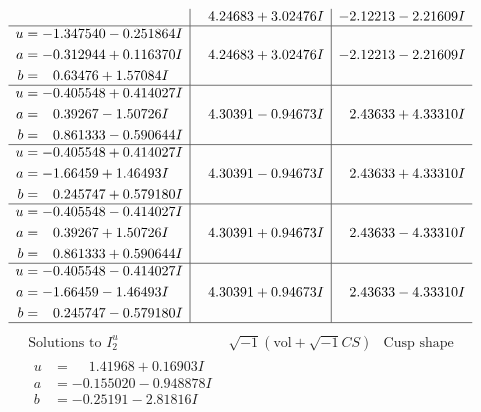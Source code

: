 \documentclass[1p]{elsarticle_modified}
\theoremstyle{definition}
\newcommand{\I}{\sqrt{-1}}
\begin{document}
$$\begin{array}{c|c|c}
 & \phantom{-}4.24683 + 3.02476 I & -2.12213 - 2.21609 I \\ \hline\begin{aligned}
u &= -1.347540 - 0.251864 I \\
a &= -0.312944 + 0.116370 I \\
b &= \phantom{-}0.63476 + 1.57084 I\end{aligned}
 & \phantom{-}4.24683 + 3.02476 I & -2.12213 - 2.21609 I \\ \hline\begin{aligned}
u &= -0.405548 + 0.414027 I \\
a &= \phantom{-}0.39267 - 1.50726 I \\
b &= \phantom{-}0.861333 - 0.590644 I\end{aligned}
 & \phantom{-}4.30391 - 0.94673 I & \phantom{-}2.43633 + 4.33310 I \\ \hline\begin{aligned}
u &= -0.405548 + 0.414027 I \\
a &= -1.66459 + 1.46493 I \\
b &= \phantom{-}0.245747 + 0.579180 I\end{aligned}
 & \phantom{-}4.30391 - 0.94673 I & \phantom{-}2.43633 + 4.33310 I \\ \hline\begin{aligned}
u &= -0.405548 - 0.414027 I \\
a &= \phantom{-}0.39267 + 1.50726 I \\
b &= \phantom{-}0.861333 + 0.590644 I\end{aligned}
 & \phantom{-}4.30391 + 0.94673 I & \phantom{-}2.43633 - 4.33310 I \\ \hline\begin{aligned}
u &= -0.405548 - 0.414027 I \\
a &= -1.66459 - 1.46493 I \\
b &= \phantom{-}0.245747 - 0.579180 I\end{aligned}
 & \phantom{-}4.30391 + 0.94673 I & \phantom{-}2.43633 - 4.33310 I\\
 \hline 
 \end{array}$$\newpage$$\begin{array}{c|c|c}  
\text{Solutions to }I^u_{2}& \I (\text{vol} + \sqrt{-1}CS) & \text{Cusp shape}\\
 \hline 
\begin{aligned}
u &= \phantom{-}1.41968 + 0.16903 I \\
a &= -0.155020 - 0.948878 I \\
b &= -0.25191 - 2.81816 I\end{aligned}

\end{array}$$
\end{document}

